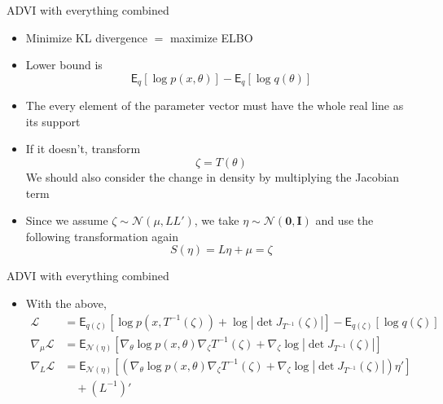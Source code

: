 \documentclass[color=usernames,dvipsnames]{beamer}
\begin{document}
\begin{frame}{ADVI with everything combined}
  \begin{itemize}
    \item<+-> Minimize KL divergence $=$ maximize ELBO
    \item<+-> Lower bound is
    \begin{equation}
      \mathsf{E}_{q}\left[\log p(x,\theta)\right]-\mathsf{E}_{q}\left[\log q(\theta)\right]
    \end{equation}
    \item<+-> The every element of the parameter vector must have the whole real line as its support
    \item<+-> If it doesn't, transform
    \begin{equation}
      \zeta = T(\theta)
    \end{equation}
    We should also consider the change in density by multiplying the Jacobian term
    \item<+-> Since we assume $\zeta\sim\mathcal{N}(\mu,LL')$, we take $\eta\sim\mathcal{N}(\mathbf{0},\mathbf{I})$ and use the following transformation again
    \begin{equation}
      S(\eta) = L\eta+\mu = \zeta
    \end{equation}
  \end{itemize}
\end{frame}
\begin{frame}{ADVI with everything combined}
  \begin{itemize}
    \item<+-> With the above,
    \begin{align*}
    \mathcal{L} &= \mathsf{E}_{q(\zeta)}\left[\log p(x,T^{-1}(\zeta))+\log\left|\det J_{T^{-1}}(\zeta)\right|\right]-\mathsf{E}_{q(\zeta)}\left[\log q(\zeta)\right]\\
    \nabla_{\mu}\mathcal{L} &= \mathsf{E}_{\mathcal{N}(\eta)}\left[\nabla_{\theta}\log p(x,\theta)\nabla_{\zeta}T^{-1}(\zeta)+\nabla_{\zeta}\log\left|\det J_{T^{-1}}(\zeta)\right|\right]\\
      \nabla_{L}\mathcal{L} &= \mathsf{E}_{\mathcal{N}(\eta)}\left[\left(\nabla_{\theta}\log p(x,\theta)\nabla_{\zeta}T^{-1}(\zeta)+\nabla_{\zeta}\log\left|\det J_{T^{-1}}(\zeta)\right|\right)\eta' \right]\\
      &\quad +\left(L^{-1}\right)'
    \end{align*}
  \end{itemize}
\end{frame}
\end{document}
